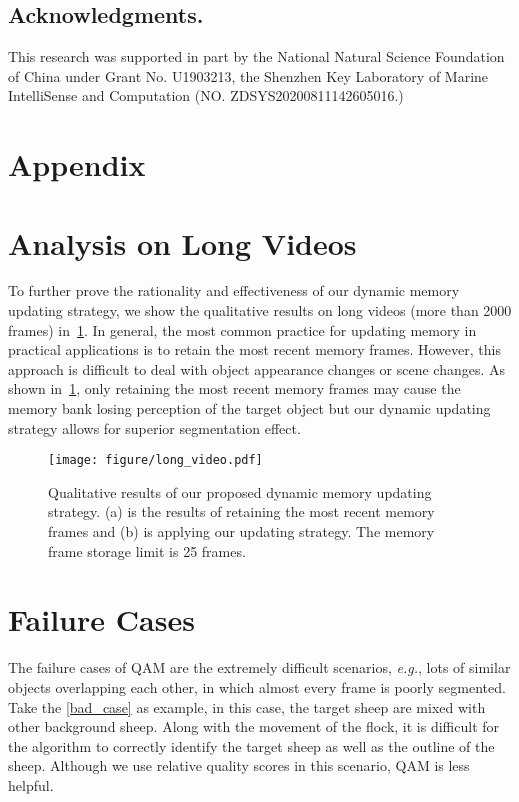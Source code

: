 \documentclass[runningheads]{llncs}
\begin{document}
\subsection*{Acknowledgments.}
This research was supported in part by the National Natural Science Foundation of China under Grant No. U1903213, the Shenzhen Key Laboratory of Marine IntelliSense and Computation (NO. ZDSYS20200811142605016.)





\newpage
\appendix
\section*{Appendix}

\section{Analysis on Long Videos}
To further prove the rationality and effectiveness of our dynamic memory updating strategy, we show the qualitative results on long videos (more than 2000 frames) in~\cref{long_video}.
In general, the most common practice for updating memory in practical applications is to retain the most recent memory frames.
However, this approach is difficult to deal with object appearance changes or scene changes.
As shown in~\cref{long_video}, only retaining the most recent memory frames may cause the memory bank losing perception of the target object but our dynamic updating strategy allows for superior segmentation effect.
    \begin{figure}[h]
      \centering
      \texttt{[image: figure/long\_video.pdf]}
      \caption{Qualitative results of our proposed dynamic memory updating strategy. (a) is the results of retaining the most recent memory frames and (b) is applying our updating strategy. The memory frame storage limit is 25 frames.}
      \label{long_video}
    \end{figure}

\section{Failure Cases}
The failure cases of QAM are the extremely difficult scenarios, \textit{e.g.}, lots of similar objects overlapping each other, in which almost every frame is poorly segmented.
Take the \cref{bad_case} as example, in this case, the target sheep are mixed with other background sheep.
Along with the movement of the flock, it is difficult for the algorithm to correctly identify the target sheep as well as the outline of the sheep.
Although we use relative quality scores in this scenario, QAM is less helpful.
\end{document}
